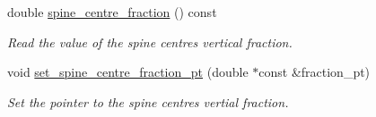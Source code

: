 \begin{DoxyCompactItemize}
double \hyperlink{classoomph_1_1BrethertonSpineMesh_a67f784e7b3a898af6c60515042c3ea73}{spine\+\_\+centre\+\_\+fraction} () const
\begin{DoxyCompactList}\small\item\em Read the value of the spine centre\textquotesingle{}s vertical fraction. \end{DoxyCompactList}\item 
void \hyperlink{classoomph_1_1BrethertonSpineMesh_a33c3ed5af92e7b22a22615f42c34c387}{set\+\_\+spine\+\_\+centre\+\_\+fraction\+\_\+pt} (double $\ast$const \&fraction\+\_\+pt)
\begin{DoxyCompactList}\small\item\em Set the pointer to the spine centre\textquotesingle{}s vertial fraction. \end{DoxyCompactList}\end{DoxyCompactItemize}

